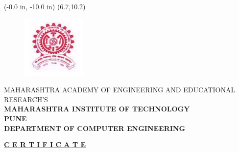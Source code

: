 \documentclass[12pt,a4paper]{report}
\begin{document}
\newpage
\pagestyle{empty}
	\thisfancyput(-0.0 in, -10.0 in) {\setlength{\unitlength}{1 in}\framebox(6.7,10.2)}
\begin{center}
\begin{figure}[h]
\centering
\includegraphics[width=1.5 cm]{mitlogo}
\end{figure}
 MAHARASHTRA ACADEMY OF ENGINEERING AND EDUCATIONAL RESEARCH\textquoteright S\\ \bf \vspace {0.001 in}MAHARASHTRA INSTITUTE OF TECHNOLOGY\\ PUNE\\\vspace {0.001 in} DEPARTMENT OF COMPUTER ENGINEERING\\
\vspace {0.0001 in}
\end{center}
\vspace{0.0005 in}
\begin{center}
\textbf{\underline{C E R T I F I C A T E}}\\
\vspace{0.0005 in}
\end{center}
		\noindent
  				\setlength{\baselineskip}{1.45\baselineskip}
\end{document}
